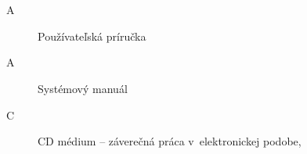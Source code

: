 
\chapter*{\appendixlistname}

\begin{description}
	\item[\appendixname{} A] Používateľská príručka
    \item[\appendixname{} A] Systémový manuál
    \item[\appendixname{} C] CD médium -- záverečná práca v~elektronickej podobe,
\end{description}

